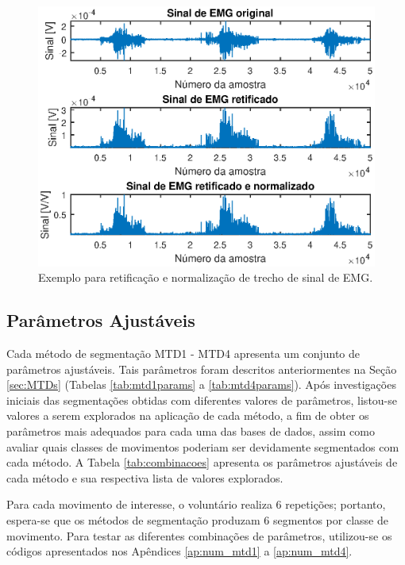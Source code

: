 \begin{figure}[htb]
	\caption{\label{fig:normalization}Exemplo para retificação e normalização de trecho de sinal de EMG.}
	\begin{center}
	    \includegraphics[width=0.75\linewidth]{./img/matlab/prettyRaw.eps}
	\end{center}
\end{figure}

				\subsection{Parâmetros Ajustáveis}
Cada método de segmentação MTD1 - MTD4 apresenta um conjunto de parâmetros ajustáveis. Tais parâmetros foram descritos anteriormentes na Seção \ref{sec:MTDs} (Tabelas \ref{tab:mtd1params} a \ref{tab:mtd4params}). Após investigações iniciais das segmentações obtidas com diferentes valores de parâmetros, listou-se valores a serem explorados na aplicação de cada método, a fim de obter os parâmetros mais adequados para cada uma das bases de dados, assim como avaliar quais classes de movimentos poderiam ser devidamente segmentados com cada método. A Tabela \ref{tab:combinacoes} apresenta os parâmetros ajustáveis de cada método e sua respectiva lista de valores explorados.



Para cada movimento de interesse, o voluntário realiza 6 repetições; portanto, espera-se que os métodos de segmentação produzam 6 segmentos por classe de movimento. Para testar as diferentes combinações de parâmetros, utilizou-se os códigos apresentados nos Apêndices \ref{ap:num_mtd1} a \ref{ap:num_mtd4}.

